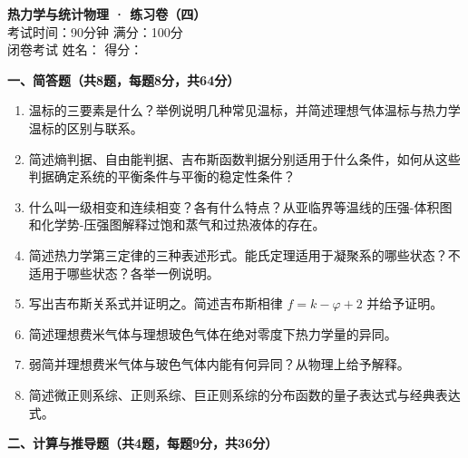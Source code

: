 \documentclass[12pt,a4paper,fontset=mac]{ctexart}
\newcommand{\đ}{\mathrm{đ}}
\begin{document}
\begin{center}
{\LARGE \textbf{热力学与统计物理 · 练习卷（四）}}\\[0.5em]
{\large 考试时间：90分钟 \quad 满分：100分}\\[0.3em]
{\normalsize 闭卷考试 \quad 姓名：\underline{\hspace{3cm}} \quad 得分：\underline{\hspace{2cm}}}
\end{center}
\vspace{0.5em}

\noindent\textbf{一、简答题（共8题，每题8分，共64分）}

\begin{enumerate}
\item 温标的三要素是什么？举例说明几种常见温标，并简述理想气体温标与热力学温标的区别与联系。

\item 简述熵判据、自由能判据、吉布斯函数判据分别适用于什么条件，如何从这些判据确定系统的平衡条件与平衡的稳定性条件？

\item 什么叫一级相变和连续相变？各有什么特点？从亚临界等温线的压强-体积图和化学势-压强图解释过饱和蒸气和过热液体的存在。

\item 简述热力学第三定律的三种表述形式。能氏定理适用于凝聚系的哪些状态？不适用于哪些状态？各举一例说明。

\item 写出吉布斯关系式并证明之。简述吉布斯相律 $f = k - \varphi + 2$ 并给予证明。

\item 简述理想费米气体与理想玻色气体在绝对零度下热力学量的异同。

\item 弱简并理想费米气体与玻色气体内能有何异同？从物理上给予解释。

\item 简述微正则系综、正则系综、巨正则系综的分布函数的量子表达式与经典表达式。
\end{enumerate}

\newpage

\noindent\textbf{二、计算与推导题（共4题，每题9分，共36分）}
\end{document}
